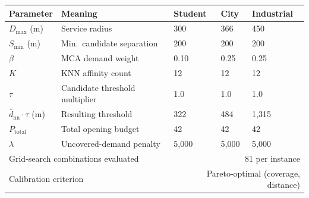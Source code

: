 \begin{tabular}{lllll}
\toprule
\textbf{Parameter} & \textbf{Meaning}
  & \textbf{Student} & \textbf{City} & \textbf{Industrial} \\
\midrule
$D_{\max}$ (m)
  & Service radius
  & 300 & 366 & 450 \\
$S_{\min}$ (m)
  & Min.\ candidate separation
  & 200 & 200 & 200 \\
$\beta$
  & MCA demand weight
  & 0.10 & 0.25 & 0.25 \\
$K$
  & KNN affinity count
  & 12 & 12 & 12 \\
$\tau$
  & Candidate threshold multiplier
  & 1.0 & 1.0 & 1.0 \\
$\bar{d}_{\text{nn}} \cdot \tau$ (m)
  & Resulting threshold
  & 322 & 484 & 1{,}315 \\
$P_{\text{total}}$
  & Total opening budget
  & 42 & 42 & 42 \\
$\lambda$
  & Uncovered-demand penalty
  & 5{,}000 & 5{,}000 & 5{,}000 \\
\midrule
\multicolumn{2}{l}{Grid-search combinations evaluated} & \multicolumn{3}{r}{81 per instance} \\
\multicolumn{2}{l}{Calibration criterion} & \multicolumn{3}{r}{Pareto-optimal (coverage, distance)} \\
\bottomrule
\end{tabular}
